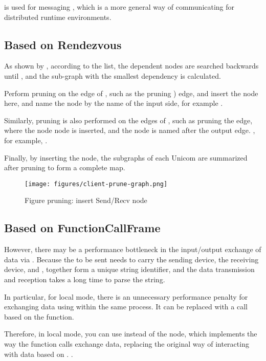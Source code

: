  is used for  messaging , which is a more general way of communicating for distributed runtime environments.


\subsection{Based on Rendezvous}
As shown by , according to the  list, the dependent nodes are searched backwards until , and the sub-graph with the smallest dependency is calculated.

Perform pruning on the edge of , such as the pruning ) edge, and insert the node  here, and name the node by the name of the input side, for example .

Similarly, pruning is also performed on the edges of , such as pruning the  edge, where the node  node is inserted, and the node is named after the output edge. , for example, .

Finally, by inserting the  node, the subgraphs of each Unicom are summarized after pruning to form a complete  map.

\begin{figure}[H]
  \centering
  \texttt{[image: figures/client-prune-graph.png]}
  \caption{Figure pruning: insert Send/Recv node}
  \label{fig:client-prune-graph}
\end{figure}


\subsection{Based on FunctionCallFrame}
However, there may be a performance bottleneck in the input/output exchange of data via . Because the  to be sent needs to carry the sending device, the receiving device, and , together form a unique string identifier, and the data transmission and reception takes a long time to parse the string.

In particular, for local mode, there is an unnecessary performance penalty for exchanging data using  within the same process. It can be replaced with a call based on the  function.

Therefore, in local mode, you can use  instead of the  node, which implements the way the function calls exchange data, replacing the original way of interacting with data based on . .

